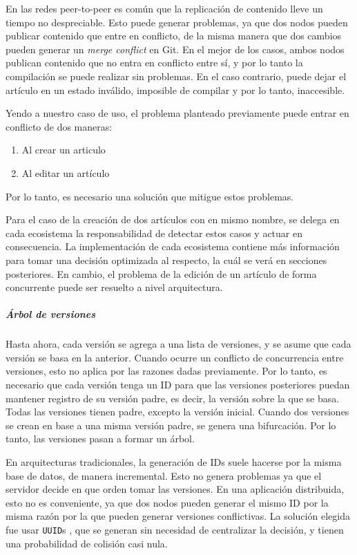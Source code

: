 En las redes peer-to-peer es común que la replicación de contenido lleve un tiempo no despreciable. Esto puede generar problemas, ya que dos nodos pueden publicar contenido que entre en conflicto, de la misma manera que dos cambios pueden generar un \textit{merge conflict} en Git. En el mejor de los casos, ambos nodos publican
contenido que no entra en conflicto entre sí, y por lo tanto la compilación se puede realizar sin problemas. En el caso contrario, puede dejar el artículo en un estado inválido, imposible de compilar y por lo tanto, inaccesible.

Yendo a nuestro caso de uso, el problema planteado previamente puede entrar en conflicto de dos maneras:
\begin{enumerate}
    \item Al crear un articulo
    \item Al editar un artículo
\end{enumerate}

Por lo tanto, es necesario una solución que mitigue estos problemas.

Para el caso de la creación de dos artículos con en mismo nombre, se delega en cada ecosistema la responsabilidad de detectar estos casos y actuar en consecuencia. La implementación de cada ecosistema contiene más información para tomar una decisión optimizada al respecto, la cuál se verá en secciones posteriores. En cambio, el problema de la edición de un artículo de forma concurrente puede ser resuelto a nivel arquitectura.

\subparagraph{Árbol de versiones}

Hasta ahora, cada versión se agrega a una lista de versiones, y se asume que cada versión se basa en la anterior. Cuando ocurre un conflicto de concurrencia entre versiones, esto no aplica por las razones dadas previamente. Por lo tanto, es necesario que cada versión tenga un ID para que las versiones posteriores puedan mantener registro de su versión padre, es decir, la versión sobre la que se basa. Todas las versiones tienen padre, excepto la versión inicial. Cuando dos versiones se crean en base a una misma versión padre, se genera una bifurcación. Por lo tanto, las versiones pasan a formar un árbol.

En arquitecturas tradicionales, la generación de IDs suele hacerse por la misma base de datos, de manera incremental. Esto no genera problemas ya que el servidor decide en que orden tomar las versiones. En una aplicación distribuida, esto no es conveniente, ya que dos nodos pueden generar el mismo ID por la misma razón por la que pueden generar versiones conflictivas. La solución elegida fue usar \texttt{UUID}s \cite{uuid}, que se generan sin necesidad de centralizar la decisión, y tienen una probabilidad de colisión casi nula.

